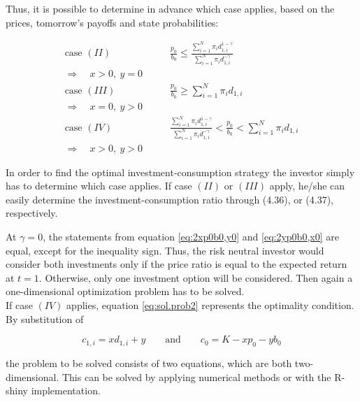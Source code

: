 \bigskip

\noindent Thus, it is possible to determine in advance which case applies, based on the prices, tomorrow's payoffs and state probabilities:

\begin{equation*}
\begin{split}
    \text{case } (II)& \qquad \frac{p_0}{b_0} \leq \frac{\sum_{i=1}^{N} \pi_i d_{1,i}^{1-\gamma}}{\sum_{i=1}^{N} \pi_i d_{1,i}^{-\gamma}}\\
    \Rightarrow \quad x>0,\ y = 0&\\
    \text{case } (III)& \qquad \frac{p_0}{b_0} \geq \sum_{i=1}^{N} \pi_i d_{1,i}\\
    \Rightarrow \quad x=0,\ y > 0&\\
    \text{case } (IV)& \qquad \frac{\sum_{i=1}^{N} \pi_i d_{1,i}^{1-\gamma}}{\sum_{i=1}^{N} \pi_i d_{1,i}^{-\gamma}} < \frac{p_0}{b_0} < \sum_{i=1}^{N} \pi_i d_{1,i} \\
    \Rightarrow \quad x > 0,\ y > 0&
\end{split}
\end{equation*}

\bigskip

\noindent In order to find the optimal investment-consumption strategy the investor simply has to determine which case applies. If case $(II)$ or $(III)$ apply, he/she can easily determine the investment-consumption ratio through (4.36), or (4.37), respectively.\\

\smallskip

\noindent At $\gamma = 0$, the statements from equation \eqref{eq:2xp0b0,y0} and \eqref{eq:2yp0b0,x0} are equal, except for the inequality sign. Thus, the risk neutral investor would consider both investments only if the price ratio is equal to the expected return at $t=1$. Otherwise, only one investment option will be considered. Then again a one-dimensional optimization problem has to be solved.\\

\noindent If case $(IV)$ applies, equation \eqref{eq:sol.prob2} represents the optimality condition. By substitution of

\begin{equation*}
    c_{1,i} = x d_{1,i} + y \qquad \text{and} \qquad c_0 = K - x p_0 - y b_0
\end{equation*}

\bigskip

\noindent the problem to be solved consists of two equations, which are both two-dimensional. This can be solved by applying numerical methods or with the R-shiny implementation.

